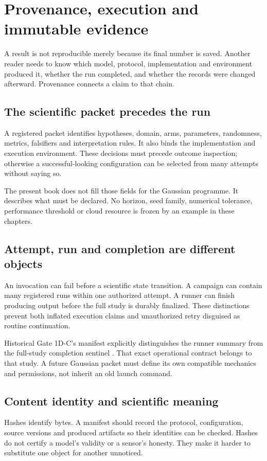 \chapter{Provenance, execution and immutable evidence}\label{ch:provenance}
A result is not reproducible merely because its final number is saved.
Another reader needs to know which model, protocol, implementation and
environment produced it, whether the run completed, and whether the records
were changed afterward. Provenance connects a claim to that chain.

\section{The scientific packet precedes the run}
A registered packet identifies hypotheses, domain, arms, parameters,
randomness, metrics, falsifiers and interpretation rules. It also binds the
implementation and execution environment. These decisions must precede
outcome inspection; otherwise a successful-looking configuration can be
selected from many attempts without saying so.

The present book does not fill those fields for the Gaussian programme.
It describes what must be declared. No horizon, seed family, numerical
tolerance, performance threshold or cloud resource is frozen by an example
in these chapters.

\section{Attempt, run and completion are different objects}
An invocation can fail before a scientific state transition. A campaign
can contain many registered runs within one authorized attempt. A runner
can finish producing output before the full study is durably finalized.
These distinctions prevent both inflated execution claims and unauthorized
retry disguised as routine continuation.

Historical Gate 1D-C's manifest explicitly distinguishes the runner summary
from the full-study completion sentinel \cite{gate}. That exact operational
contract belongs to that study. A future Gaussian packet must define its
own compatible mechanics and permissions, not inherit an old launch command.

\section{Content identity and scientific meaning}
Hashes identify bytes. A manifest should record the protocol, configuration,
source versions and produced artifacts so their identities can be checked.
Hashes do not certify a model's validity or a sensor's honesty. They make
it harder to substitute one object for another unnoticed.

